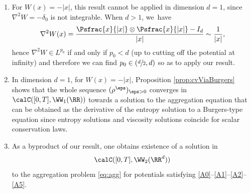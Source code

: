 \skpt
\begin{remark}
\begin{enumerate}
\item For $W(x) = -|x|$, this result cannot be applied in dimension $d=1$, since $\nabla^2 W = - \delta_0$ is not integrable. When $d>1$, we~have
\[
\nabla^2 W(x) = \frac{\Psfrac{x}{|x|} \otimes \Psfrac{x}{|x|} - I_d}{|x|} \sim \frac{1}{|x|},
\]
hence $\nabla^2 W \in L^{p_0}$ if and only if $p_0 < d$ (up to cutting off the potential at infinity) and therefore we can find $p_0 \in(\sfrac d2, d)$ so as to apply our result.
\item In dimension $d=1$, for $W(x) = - |x|$, Proposition \ref{prop:cvViaBurgers} shows that the whole sequence $(\rho^\eps)_{\eps > 0}$ converges in $\calC([0,T], \WW_1(\RR))$ towards a solution to the aggregation equation that can be obtained as the derivative of the entropy solution to a Burgers-type equation since entropy solutions and viscosity solutions coincide for scalar conservation laws.
\item As a byproduct of our result, one obtains existence of a solution in
\[
\calC([0,T], \WW _2(\RR^d))
\]
to the aggregation problem \eqref{eq:agg} for potentials satisfying \eqref{A0}--\eqref{A1}--\eqref{A2}--\eqref{A5}.
\end{enumerate}
\end{remark}
